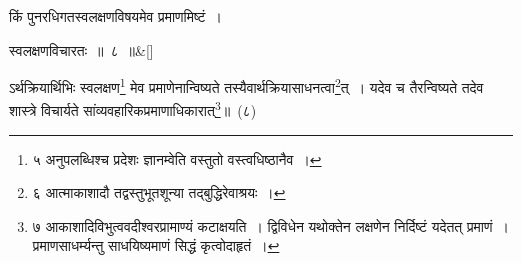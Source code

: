 \documentclass[article,12pt,a4paper]{memoir}
\begin{document}
	  \pstart किं पुनरधिगतस्वलक्षणविषयमेव प्रमाणमिष्टं ।
	\pend
      
	  \bigskip
	  \begingroup
	
	    \large
	  
	    
	    \stanza[\smallbreak]
	\label{pv.1.8d}स्वलक्षणविचारतः ॥ ८ ॥\&[\smallbreak]


	
	  \endgroup
	

	  ऽर्थक्रियार्थिभिः स्वलक्षण\footnote{\label{pvv.9-5}  ५ अनुपलब्धिश्च प्रदेशः ज्ञानम्वेति वस्तुतो वस्त्वधिष्ठानैव ।} मेव प्रमाणेनान्विष्यते तस्यैवार्थक्रियासाधनत्वा\footnote{\label{pvv.9-6}  ६ आत्माकाशादौ तद्वस्तुभूतशून्या तद्बुद्धिरेवाश्रयः ।}त् । यदेव च तैरन्विष्यते तदेव शास्त्रे विचार्यते सांव्यवहारिकप्रमाणाधिकारात्\footnote{\label{pvv.9-7}  ७ आकाशादिविभुत्ववदीश्वरप्रामाण्यं कटाक्षयति । द्विविधेन यथोक्तेन लक्षणेन निर्दिष्टं यदेतत् प्रमाणं । प्रमाणसाधर्म्यन्तु साधयिष्यमाणं सिद्धं कृत्वोदाहृतं ।}॥ (८)
	\pend
      
	    
	    \endnumbering%
	    \endgroup
	    
     \backmatter 
\end{document}
